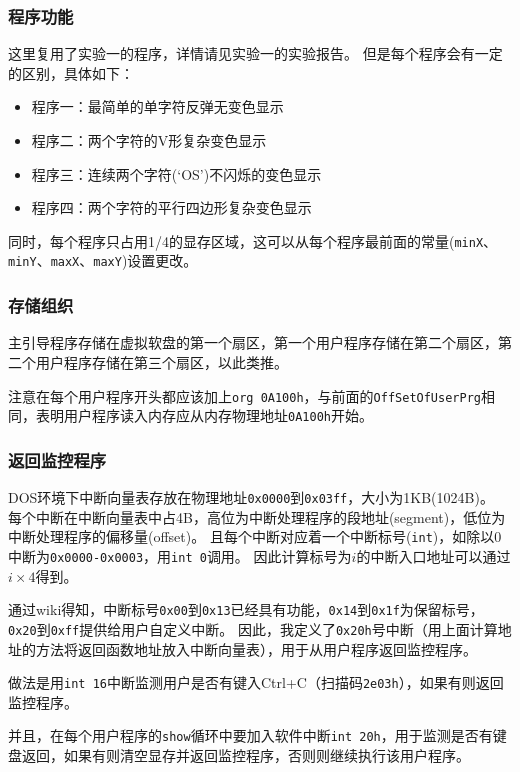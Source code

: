 \documentclass[logo,reportComp]{thesis}
\begin{document}
\subsubsection{程序功能}
这里复用了实验一的程序，详情请见实验一的实验报告。
但是每个程序会有一定的区别，具体如下：
\begin{itemize}
	\item 程序一：最简单的单字符反弹无变色显示
	\item 程序二：两个字符的V形复杂变色显示
	\item 程序三：连续两个字符(`OS')不闪烁的变色显示
	\item 程序四：两个字符的平行四边形复杂变色显示
\end{itemize}

同时，每个程序只占用1/4的显存区域，这可以从每个程序最前面的常量(\verb'minX'、\verb'minY'、\verb'maxX'、\verb'maxY')设置更改。

\subsubsection{存储组织}
主引导程序存储在虚拟软盘的第一个扇区，第一个用户程序存储在第二个扇区，第二个用户程序存储在第三个扇区，以此类推。

注意在每个用户程序开头都应该加上\verb'org 0A100h'，与前面的\verb'OffSetOfUserPrg'相同，表明用户程序读入内存应从内存物理地址\verb'0A100h'开始。

\subsubsection{返回监控程序}
DOS环境下中断向量表存放在物理地址\verb'0x0000'到\verb'0x03ff'，大小为1KB(1024B)。
每个中断在中断向量表中占4B，高位为中断处理程序的段地址(segment)，低位为中断处理程序的偏移量(offset)。
且每个中断对应着一个中断标号(\verb'int')，如除以0中断为\verb'0x0000-0x0003'，用\verb'int 0'调用。
因此计算标号为$i$的中断入口地址可以通过$i\times 4$得到。

通过wiki得知，中断标号\verb'0x00'到\verb'0x13'已经具有功能，\verb'0x14'到\verb'0x1f'为保留标号，\verb'0x20'到\verb'0xff'提供给用户自定义中断。
因此，我定义了\verb'0x20h'号中断（用上面计算地址的方法将返回函数地址放入中断向量表），用于从用户程序返回监控程序。

做法是用\verb'int 16'中断监测用户是否有键入Ctrl+C（扫描码\verb'2e03h'），如果有则返回监控程序。

并且，在每个用户程序的\verb'show'循环中要加入软件中断\verb'int 20h'，用于监测是否有键盘返回，如果有则清空显存并返回监控程序，否则则继续执行该用户程序。
\end{document}
